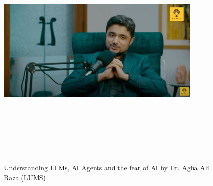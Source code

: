 \documentclass[a4paper,12pt]{article}
\begin{document}
\vspace{40pt} %
\begin{figure}[h]
	\centering
	\vspace{-10pt} %
	\includegraphics[width=0.9\textwidth, height=12cm, keepaspectratio]{../Talks Blogs/Understanding LLMs, AI Agents and the fear of AI}
	\vspace{-5pt} %
	\caption{Understanding LLMs, AI Agents and the fear of AI by Dr. Agha Ali Raza (LUMS)}
	\vspace{-10pt}
\end{figure}
\end{document}
